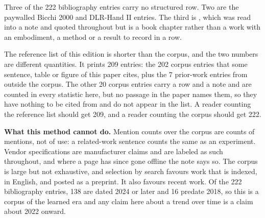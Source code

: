 Three of the 222 bibliography entries carry no structured row. Two are the paywalled Bicchi 2000
and DLR-Hand II entries. The third is \cite{bicchi_grasping_chapter_2001}, which was read into a
note and quoted throughout but is a book chapter rather than a work with an embodiment, a method
or a result to record in a row.

The reference list of this edition is shorter than the corpus, and the two numbers are
different quantities. It prints 209 entries: the 202 corpus entries that some sentence, table
or figure of this paper cites, plus the 7 prior-work entries from outside the corpus. The other
20 corpus entries carry a row and a note and are counted in every statistic here, but no
passage in the paper names them, so they have nothing to be cited from and do not appear in the
list. A reader counting the reference list should get 209, and a reader counting the corpus
should get 222.

\textbf{What this method cannot do.}
Mention counts over the corpus are counts of mentions, not of use: a related-work sentence
counts the same as an experiment. Vendor specifications are manufacturer claims and are labeled
as such throughout, and where a page has since gone offline the note says so. The corpus is
large but not exhaustive, and selection by search favours work that is indexed, in English, and
posted as a preprint. It also favours recent work. Of the 222 bibliography entries, 138 are dated
2024 or later and 16 predate 2018, so this is a corpus of the learned era and any claim here
about a trend over time is a claim about 2022 onward.

